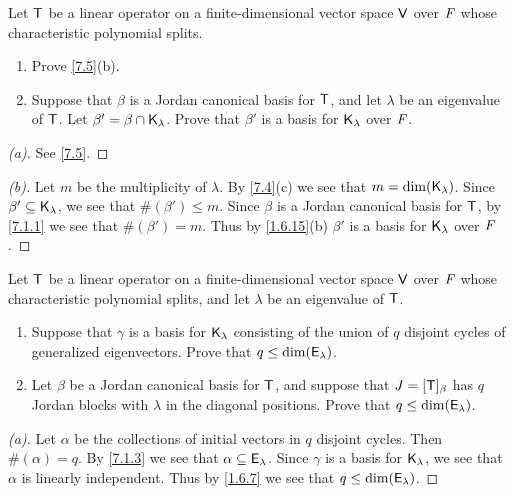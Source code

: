 \begin{ex}\label{ex:7.1.9}
  Let \(\mathsf{T}\) be a linear operator on a finite-dimensional vector space \(\mathsf{V}\) over \(\mathit{F}\) whose characteristic polynomial splits.
  \begin{enumerate}
    \item Prove \cref{7.5}(b).
    \item Suppose that \(\beta\) is a Jordan canonical basis for \(\mathsf{T}\), and let \(\lambda\) be an eigenvalue of \(\mathsf{T}\).
          Let \(\beta' = \beta \cap \mathsf{K}_{\lambda}\).
          Prove that \(\beta'\) is a basis for \(\mathsf{K}_{\lambda}\) over \(\mathit{F}\).
  \end{enumerate}
\end{ex}

\begin{proof}[(a)]
  See \cref{7.5}.
\end{proof}

\begin{proof}[(b)]
  Let \(m\) be the multiplicity of \(\lambda\).
  By \cref{7.4}(c) we see that \(m = \dim(\mathsf{K}_{\lambda})\).
  Since \(\beta' \subseteq \mathsf{K}_{\lambda}\), we see that \(\#(\beta') \leq m\).
  Since \(\beta\) is a Jordan canonical basis for \(\mathsf{T}\), by \cref{7.1.1} we see that \(\#(\beta') = m\).
  Thus by \cref{1.6.15}(b) \(\beta'\) is a basis for \(\mathsf{K}_{\lambda}\) over \(\mathit{F}\).
\end{proof}

\begin{ex}\label{ex:7.1.10}
  Let \(\mathsf{T}\) be a linear operator on a finite-dimensional vector space \(\mathsf{V}\) over \(\mathit{F}\) whose characteristic polynomial splits, and let \(\lambda\) be an eigenvalue of \(\mathsf{T}\).
  \begin{enumerate}
    \item Suppose that \(\gamma\) is a basis for \(\mathsf{K}_{\lambda}\) consisting of the union of \(q\) disjoint cycles of generalized eigenvectors.
          Prove that \(q \leq \dim(\mathsf{E}_{\lambda})\).
    \item Let \(\beta\) be a Jordan canonical basis for \(\mathsf{T}\), and suppose that \(J = [\mathsf{T}]_{\beta}\) has \(q\) Jordan blocks with \(\lambda\) in the diagonal positions.
          Prove that \(q \leq \dim(\mathsf{E}_{\lambda})\).
  \end{enumerate}
\end{ex}

\begin{proof}[(a)]
  Let \(\alpha\) be the collections of initial vectors in \(q\) disjoint cycles.
  Then \(\#(\alpha) = q\).
  By \cref{7.1.3} we see that \(\alpha \subseteq \mathsf{E}_{\lambda}\).
  Since \(\gamma\) is a basis for \(\mathsf{K}_{\lambda}\), we see that \(\alpha\) is linearly independent.
  Thus by \cref{1.6.7} we see that \(q \leq \dim(\mathsf{E}_{\lambda})\).
\end{proof}


